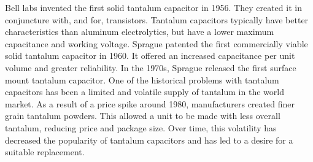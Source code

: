 Bell labs invented the first solid tantalum capacitor in 1956. They created it in conjuncture with, and for, transistors.\cite[f.~56-64]{dumInv} Tantalum capacitors typically have better characteristics than aluminum electrolytics, but have a lower maximum capacitance and working voltage.\cite{learn_caps}
Sprague patented the first commercially viable solid tantalum capacitor in 1960. It offered an increased capacitance per unit volume and greater reliability.\cite{charTant} In the 1970s, Sprague released the first surface mount tantalum capacitor.\cite{spragueHist}
One of the historical problems with tantalum capacitors has been a limited and volatile supply of tantalum in the world market. 
As a result of a price spike around 1980, manufacturers created finer grain tantalum powders. This allowed a unit to be made with less overall tantalum, reducing price and package size.\cite[ch~3.1]{tantMis}
Over time, this volatility has decreased the popularity of tantalum capacitors and has led to a desire for a suitable replacement.

